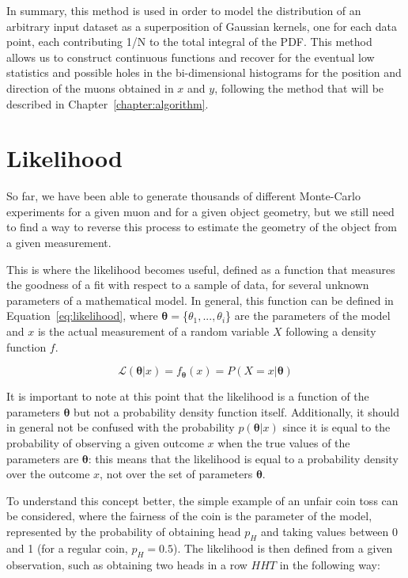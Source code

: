 \documentclass[a4paper, 11pt]{report}
\begin{document}
In summary, this method is used in order to model the distribution of an arbitrary input dataset as a superposition of Gaussian kernels, one for each data point, each contributing 1/N to the total integral of the PDF. This method allows us to construct continuous functions and recover for the eventual low statistics and possible holes in the bi-dimensional histograms for the position and direction of the muons obtained in $x$ and $y$, following the method that will be described in Chapter~\ref{chapter:algorithm}.

\section{Likelihood} \label{sec:Likelihood}

So far, we have been able to generate thousands of different Monte-Carlo experiments for a given muon and for a given object geometry, but we still need to find a way to reverse this process to estimate the geometry of the object from a given measurement. 

This is where the likelihood becomes useful, defined as a function that measures the goodness of a fit with respect to a sample of data, for several unknown parameters of a mathematical model. In general, this function can be defined in Equation~\ref{eq:likelihood}, where $\bm \theta = $\{$\theta_1, ..., \theta_i$\} are the parameters of the model and $x$ is the actual measurement of a random variable $X$ following a density function $f$.

\begin{equation}
\label{eq:likelihood}
\mathcal{L}(\bm \theta | x) = f_{\bm \theta}(x) = P(X = x | \bm \theta)
\end{equation}

It is important to note at this point that the likelihood is a function of the parameters $\bm \theta$ but not a probability density function itself. Additionally, it should in general not be confused with the probability $p(\bm \theta | x)$ since it is equal to the probability of observing a given outcome $x$ when the true values of the parameters are $\bm \theta$: this means that the likelihood is equal to a probability density over the outcome $x$, not over the set of parameters $\bm \theta$.

To understand this concept better, the simple example of an unfair coin toss can be considered, where the fairness of the coin is the parameter of the model, represented by the probability of obtaining head $p_H$ and taking values between 0 and 1 (for a regular coin, $p_H = 0.5$). The likelihood is then defined from a given observation, such as obtaining two heads in a row $HHT$ in the following way:
\end{document}
